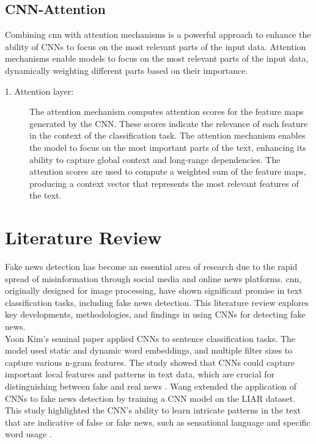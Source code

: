 \subsection{CNN-Attention}

Combining \ac{cnn} with attention mechanisms is a powerful approach to enhance the ability of CNNs to focus on the most relevant parts of the input data. Attention mechanisms enable models to focus on the most relevant parts of the input data, dynamically weighting different parts based on their importance.

\begin{description}

    \item[1. Attention layer:] The attention mechanism computes attention scores for the feature maps generated by the CNN. These scores indicate the relevance of each feature in the context of the classification task. The attention mechanism enables the model to focus on the most important parts of the text, enhancing its ability to capture global context and long-range dependencies. The attention scores are used to compute a weighted sum of the feature maps, producing a context vector that represents the most relevant features of the text.
    
\end{description}

\section{Literature Review}

Fake news detection has become an essential area of research due to the rapid spread of misinformation through social media and online news platforms. \ac{cnn}, originally designed for image processing, have shown significant promise in text classification tasks, including fake news detection. This literature review explores key developments, methodologies, and findings in using CNNs for detecting fake news.\\

Yoon Kim's seminal paper applied CNNs to sentence classification tasks. The model used static and dynamic word embeddings, and multiple filter sizes to capture various n-gram features. The study showed that CNNs could capture important local features and patterns in text data, which are crucial for distinguishing between fake and real news \cite{kim2014convolutional}. Wang extended the application of CNNs to fake news detection by training a CNN model on the LIAR dataset. This study highlighted the CNN's ability to learn intricate patterns in the text that are indicative of false or fake news, such as sensational language and specific word usage \cite{wang-2017-liar}. \\

